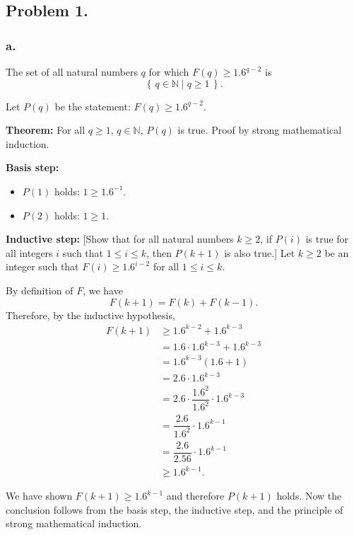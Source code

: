 \documentclass[11pt, letterpaper, titlepage]{article}
\begin{document}
\onehalfspacing

\subsection*{Problem 1.}
\subsubsection*{a.}
The set of all natural numbers $q$ for which $F(q) \geq 1.6^{q-2}$ is
\begin{equation}
    \left\lbrace\,
        q \in \mathbb{N}
        \mid
        q \geq 1
    \,\right\rbrace.
\end{equation}

Let $P(q)$ be the statement: $F(q) \geq 1.6^{q-2}$.

\textbf{Theorem:} For all $q \geq 1$, $q \in \mathbb{N}$, $P(q)$ is true. Proof by strong mathematical induction.

\textbf{Basis step:} 
\begin{itemize}
    \item $P(1)$ holds: $1 \geq 1.6^{-1}$.
    \item $P(2)$ holds: $1 \geq 1$.
\end{itemize}

\textbf{Inductive step:} [Show that for all natural numbers $k \geq 2$, if $P(i)$ is true for all integers $i$ such that $1 \leq i \leq k$, then $P(k+1)$ is also true.] Let $k \geq 2$ be an integer such that $F(i) \geq 1.6^{i-2}$ for all $1 \leq i \leq k$.

By definition of $F$, we have 
\begin{equation}
    F(k+1) = F(k) + F(k - 1).
\end{equation}
Therefore, by the inductive hypothesis,
\begin{align}
    F(k+1) &\geq 1.6^{k - 2} + 1.6^{k - 3} \\
    &= 1.6 \cdot 1.6^{k - 3} + 1.6^{k - 3} \\
    &= 1.6^{k - 3}(1.6 + 1) \\
    &= 2.6 \cdot 1.6^{k - 3} \\
    &= 2.6 \cdot \dfrac{1.6^2}{1.6^2} \cdot 1.6^{k - 3} \\
    &= \dfrac{2.6}{1.6^2} \cdot 1.6^{k - 1} \\
    &= \dfrac{2.6}{2.56} \cdot 1.6^{k - 1} \\
    &\geq 1.6^{k - 1}.
\end{align}

We have shown $F(k+1) \geq 1.6^{k - 1}$ and therefore $P(k+1)$ holds. Now the conclusion follows from the basis step, the inductive step, and the principle of strong mathematical induction.
\end{document}

